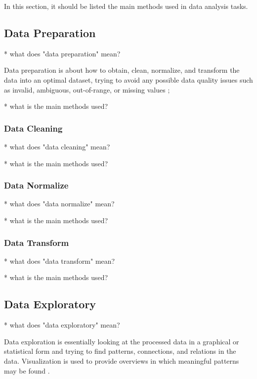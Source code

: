 \documentclass[12pt,a4paper]{amsart}
\numberwithin{equation}{section}
\theoremstyle{plain}
\theoremstyle{definition}
\begin{document}
In this section, it should be listed the main methods used in data analysis tasks.

\subsection{Data Preparation}\label{data-preparation}

* what does "data preparation" mean?

Data preparation is about how to obtain, clean, normalize, and transform the data into an optimal dataset, trying to avoid any possible data quality issues such as invalid, ambiguous, out-of-range, or missing values \cite{cuesta2016practical};

* what is the main methods used?

\subsubsection{Data Cleaning}\label{data-cleaning}

* what does "data cleaning" mean?

* what is the main methods used?

\subsubsection{Data Normalize}\label{data-normalize}

* what does "data normalize" mean?

* what is the main methods used?

\subsubsection{Data Transform}\label{data-transform}

* what does "data transform" mean?

* what is the main methods used?


\subsection{Data Exploratory}\label{data-exploratory}

* what does "data exploratory" mean?

Data exploration is essentially looking at the processed data in a graphical or statistical form and trying to find patterns, connections, and relations in the data. Visualization is used to provide overviews in which meaningful patterns may be found \cite{cuesta2016practical}.
\end{document}
